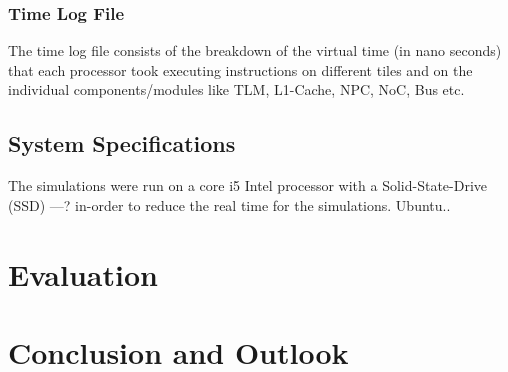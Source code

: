 \documentclass{listhesis}
\begin{document}
\subsection{Time Log File}
The time log file consists of the breakdown of the virtual time (in nano seconds) that each processor took executing instructions on different tiles and on the individual components/modules like TLM, L1-Cache, NPC, NoC, Bus etc.
\section{System Specifications}
The simulations were run on a core i5 Intel processor with a Solid-State-Drive (SSD) ---? in-order to reduce the real time for the simulations. Ubuntu..
\chapter{Evaluation}

\chapter{Conclusion and Outlook}


\cleardoublepage



\confirmation
\end{document}

